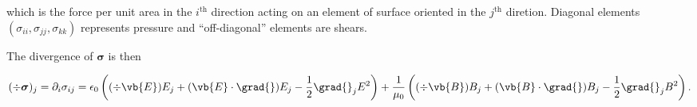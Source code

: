 \documentclass[english,a4paper,12pt]{report}
\begin{document}
which is the force per unit area in the \(i^{\text{th}} \) direction acting on an element of surface oriented in the \(j^{\text{th}} \) diretion. Diagonal elements \((\sigma _{ii}, \sigma _{jj}, \sigma _{kk}  )\) represents pressure and ``off-diagonal'' elements are shears.

The divergence of \(\boldsymbol{\sigma }  \) is then 

\begin{equation}
    \begin{aligned}
        (\div{\boldsymbol{\sigma }  } )_{j} =  \partial _{i}\sigma _{ij} = \epsilon_0 \left( (\div{\vb{E} } )E_{j} + (\vb{E} \cdot \grad{} )E_{j} - \frac{1}{2}\grad{}_{j}E^2      \right) + \frac{1}{\mu_0 } \left( (\div{\vb{B} } )B_{j}+(\vb{B} \cdot \grad{} )B_{j}-\frac{1}{2}\grad{}_{j}B^2      \right).   
    \end{aligned}
\end{equation}
\end{document}
